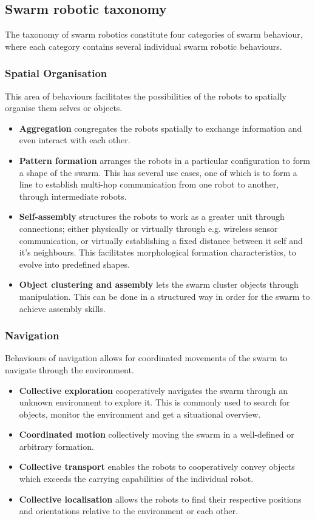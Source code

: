 \subsection{Swarm robotic taxonomy}
The taxonomy of swarm robotics constitute four categories of swarm behaviour, where each category contains several individual swarm robotic behaviours.

\subsubsection{Spatial Organisation}
This area of behaviours facilitates the possibilities of the robots to spatially organise them selves or objects. 
\begin{itemize}
    \item \textbf{Aggregation} congregates the robots spatially to exchange information and even interact with each other.
    \item \textbf{Pattern formation} arranges the robots in a particular configuration to form a shape of the swarm. This has several use cases, one of which is to form a line to establish multi-hop communication from one robot to another, through intermediate robots.
    \item \textbf{Self-assembly} structures the robots to work as a greater unit through connections; either physically or virtually through e.g. wireless sensor communication, or virtually establishing a fixed distance between it self and it's neighbours. This facilitates morphological formation characteristics, to evolve into predefined shapes.
    \item \textbf{Object clustering and assembly} lets the swarm cluster objects through  manipulation. This can be done in a structured way in order for the swarm to achieve assembly skills.
\end{itemize}

\subsubsection{Navigation}
Behaviours of navigation allows for coordinated movements of the swarm to navigate through the environment.
\begin{itemize}
    \item \textbf{Collective exploration} cooperatively navigates the swarm through an unknown environment to explore it. This is commonly used to search for objects, monitor the environment and get a situational overview. 
    \item \textbf{Coordinated motion} collectively moving the swarm in a well-defined or arbitrary formation. 
    \item \textbf{Collective transport} enables the robots to cooperatively convey objects which exceeds the carrying capabilities of the individual robot.
    \item \textbf{Collective localisation} allows the robots to find their respective positions and orientations relative to the environment or each other. 
\end{itemize}


